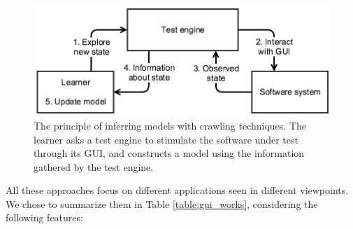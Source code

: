 \begin{figure}[ht]
    \begin{center}
        \includegraphics[width=1.0\linewidth]{figures/crawler.png}
    \end{center}

    \caption{The principle of inferring models with crawling
    techniques. The learner asks a test engine to stimulate the
	software under test through its GUI, and constructs a model
	using the information gathered by the test engine.}
    \label{fig:crawler}
\end{figure}

All these approaches focus on different applications seen in
different viewpoints. We chose to summarize them in Table
\ref{table:gui_works}, considering the following features:

